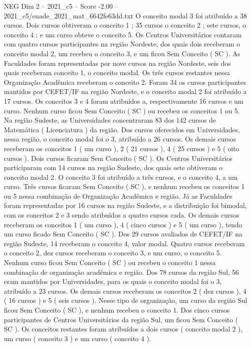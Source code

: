 \begin{textsample}{NEG Dim 2 – 2021\_c5 – Score -2.00 – 2021\_c5/enade\_2021\_mat\_6642fe63dd.txt}
O conceito modal 3 foi atribuído a 38 cursos.
Dois cursos obtiveram o conceito 1 ; 35 cursos o conceito 2 ; sete cursos, o conceito 4 ; e um curso obteve o conceito 5.
Os Centros Universitários contaram com quatro cursos participantes na região Nordeste, dos quais dois receberam o conceito modal 2, um recebeu o conceito 3, e um ficou Sem Conceito ( SC ).
As Faculdades foram representadas por nove cursos na região Nordeste, seis dos quais receberam conceito 1, o conceito modal.
Os três cursos restantes nessa Organização Acadêmica receberam o conceito 2.
Foram 34 os cursos participantes mantidos por CEFET/IF na região Nordeste, e o conceito modal 2 foi atribuído a 17 cursos.
Os conceitos 3 e 4 foram atribuídos a, respectivamente 16 cursos e um curso.
Nenhum curso ficou Sem Conceito ( SC ) ou recebeu os conceitos 1 ou 5.
Na região Sudeste, as Universidades concentraram 83 dos 142 cursos de Matemática ( Licenciatura ) da região.
Dos cursos oferecidos em Universidades, nessa região, o conceito modal foi o 3, atribuído a 26 cursos.
Os demais cursos receberam os conceitos 1 ( um curso ), 2 ( 21 cursos ), 4 ( 25 cursos ) e 5 ( oito cursos ).
Dois cursos ficaram Sem Conceito ( SC ).
Os Centros Universitários participaram com 14 cursos na região Sudeste, dos quais sete obtiveram o conceito modal 2.
O conceito 3 foi atribuído a três cursos, e o conceito 4, a um curso.
Três cursos ficaram Sem Conceito ( SC ), e nenhum recebeu os conceitos 1 ou 5 nessa combinação de Organização Acadêmica e região.
Já as Faculdades foram representadas por 16 cursos na região Sudeste, e a distribuição foi bimodal, com os conceitos 2 e 3 sendo atribuídos a quatro cursos cada.
Os demais cursos receberam os conceitos 1 ( um curso ), 4 ( cinco cursos ) e 5 ( um curso ), tendo um curso ficado Sem Conceito ( SC ).
Dos 29 cursos avaliados de CEFET/IF na região Sudeste, 14 receberam o conceito 4, valor modal.
Quatro cursos receberam o conceito 2, dez cursos receberam o conceito 3, e um curso, o conceito 5.
Nenhum curso ficou Sem Conceito ( SC ) ou recebeu o conceito 1 nessa combinação de organização acadêmica e região.
Dos 78 cursos da região Sul, 56 eram mantidos por Universidades, para os quais o conceito modal foi o 3, atribuído a 23 cursos.
Os demais cursos receberam os conceitos 2 ( dez cursos ), 4 ( 16 cursos ) e 5 ( seis cursos ).
Nesse tipo de organização, um curso da região Sul ficou Sem Conceito ( SC ), e nenhum recebeu o conceito 1.
Dos cinco cursos participantes de Centros Universitários da região Sul, um ficou Sem Conceito ( SC ).
Os conceitos restantes foram atribuídos a dois cursos ( conceito modal 2 ), um curso ( conceito 3 ) e um curso ( conceito 4 ).

\end{textsample}
